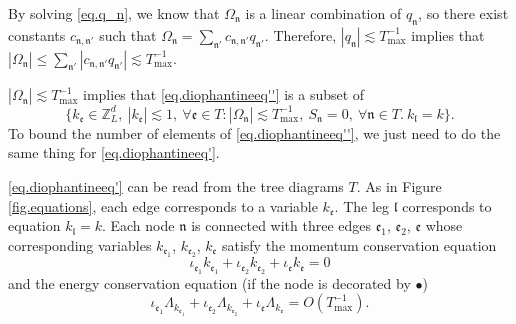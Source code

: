 By solving \eqref{eq.q_n}, we know that $\Omega_{\mathfrak{n}}$ is a linear combination of $q_{\mathfrak{n}}$, so there exist constants $c_{\mathfrak{n},\mathfrak{n}'}$ such that $\Omega_{\mathfrak{n}}=\sum_{\mathfrak{n}'}c_{\mathfrak{n},\mathfrak{n}'}q_{\mathfrak{n}'}$. Therefore, $|q_{\mathfrak{n}}|\lesssim T^{-1}_{\text{max}}$ implies that $|\Omega_{\mathfrak{n}}|\le\sum_{\mathfrak{n}'}|c_{\mathfrak{n},\mathfrak{n}'}q_{\mathfrak{n}'}|\lesssim T^{-1}_{\text{max}}$.

$|\Omega_{\mathfrak{n}}|\lesssim T^{-1}_{\text{max}}$ implies that \eqref{eq.diophantineeq''} is a subset of
\begin{equation}\label{eq.diophantineeq'}
    \{k_{\mathfrak{e}}\in \mathbb{Z}^d_L,\ |k_{\mathfrak{e}}|\lesssim 1,\ \forall \mathfrak{e}\in T: |\Omega_{\mathfrak{n}}|\lesssim T^{-1}_{\text{max}},\ S_{\mathfrak{n}}=0,\ \forall \mathfrak{n}\in T. \ k_{\mathfrak{l}}=k\}.
\end{equation}
To bound the number of elements of \eqref{eq.diophantineeq''}, we just need to do the same thing for \eqref{eq.diophantineeq'}.

\eqref{eq.diophantineeq'} can be read from the tree diagrams $T$. As in Figure \ref{fig.equations}, each edge corresponds to a variable $k_{\mathfrak{e}}$. The leg $\mathfrak{l}$ corresponds to equation $k_{\mathfrak{l}}=k$. Each node $\mathfrak{n}$ is connected with three edges $\mathfrak{e}_1$, $\mathfrak{e}_2$, $\mathfrak{e}$ whose corresponding variables $k_{\mathfrak{e}_1}$, $k_{\mathfrak{e}_2}$, $k_{\mathfrak{e}}$ satisfy the momentum conservation equation
\begin{equation}
\iota_{\mathfrak{e}_1}k_{\mathfrak{e}_1}+\iota_{\mathfrak{e}_2}k_{\mathfrak{e}_2}+\iota_{\mathfrak{e}}k_{\mathfrak{e}}=0
\end{equation}
and the energy conservation equation (if the node is decorated by $\bullet$)
\begin{equation}
    \iota_{\mathfrak{e}_1}\Lambda_{k_{\mathfrak{e}_1}}+\iota_{\mathfrak{e}_2}\Lambda_{k_{\mathfrak{e}_2}}+\iota_{\mathfrak{e}}\Lambda_{k_{\mathfrak{e}}} = O(T^{-1}_{\text{max}}).
\end{equation}



